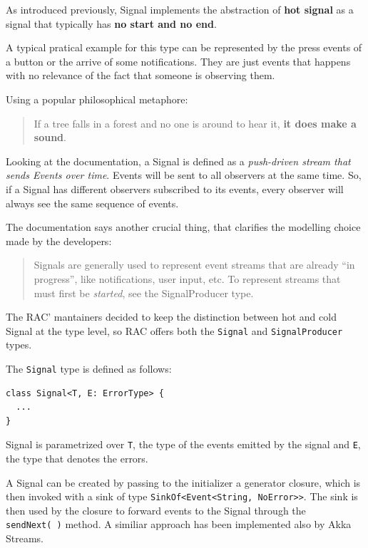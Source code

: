 As introduced previously, Signal implements the abstraction of
\textbf{hot signal} as a signal that typically has \textbf{no start and
no end}.

A typical pratical example for this type can be represented by the press
events of a button or the arrive of some notifications. They are just
events that happens with no relevance of the fact that someone is
observing them.

Using a popular philosophical metaphore:

\begin{quote}
If a tree falls in a forest and no one is around to hear it, \textbf{it
does make a sound}.
\end{quote}

Looking at the documentation, a Signal is defined as a \emph{push-driven
stream that sends Events over time}. Events will be sent to all
observers at the same time. So, if a Signal has different observers
subscribed to its events, every observer will always see the same
sequence of events.

The documentation says another crucial thing, that clarifies the
modelling choice made by the developers:

\begin{quote}
Signals are generally used to represent event streams that are already
``in progress'', like notifications, user input, etc. To represent
streams that must first be \emph{started}, see the SignalProducer type.
\end{quote}

The RAC' mantainers decided to keep the distinction between hot and cold
Signal at the type level, so RAC offers both the \texttt{Signal} and
\texttt{SignalProducer} types.

The \texttt{Signal} type is defined as follows:

\begin{verbatim}
class Signal<T, E: ErrorType> {
  ...
}
\end{verbatim}

Signal is parametrized over \texttt{T}, the type of the events emitted
by the signal and \texttt{E}, the type that denotes the errors.

A Signal can be created by passing to the initializer a generator
closure, which is then invoked with a sink of type
\texttt{SinkOf\textless{}Event\textless{}String,\ NoError\textgreater{}\textgreater{}}.
The sink is then used by the closure to forward events to the Signal
through the \texttt{sendNext(\ )} method. A similiar approach has been
implemented also by Akka Streams.

